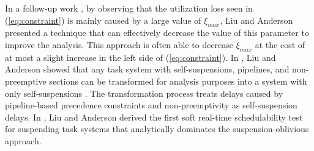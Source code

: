 In a follow-up work \cite{Liu5}, by observing that the utilization loss seen in (\ref{eq:constraint}) is mainly caused by a large value of $\xi_{max}$, Liu and Anderson presented a technique that can effectively decrease the value of this parameter to improve the analysis. 
This approach is often able to decrease $\xi_{max}$ at the cost of at most a slight increase in the left side of (\ref{eq:constraint}). 
In \cite{Liu4}, Liu and Anderson  showed that any task system with self-suspensions, pipelines, and
non-preemptive sections can be transformed for analysis purposes into a system with only self-suspensions \cite{Liu4}. The transformation process treats delays caused by pipeline-based precedence constraints and non-preemptivity as self-suspension delays.
In \cite{Liu9,Liu11}, Liu and Anderson derived the first soft real-time schedulability test for suspending task systems that analytically dominates the suspension-oblivious approach.





  